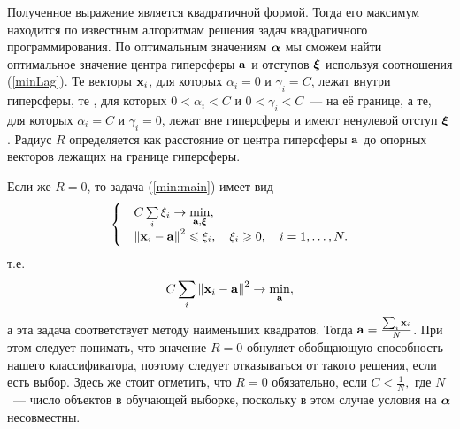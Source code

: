 Полученное выражение является квадратичной формой. 
Тогда его максимум находится по известным алгоритмам решения задач квадратичного программирования. 
По оптимальным значениям $\boldsymbol{\mathbf{\alpha}}$ мы сможем найти оптимальное значение центра гиперсферы $\boldsymbol{\mathbf{a}}$ и отступов $\boldsymbol{\mathbf{\xi}}$ используя соотношения (\ref{minLag}). 
Те векторы $\boldsymbol{\mathbf{x}}_i$, для которых $\alpha_i=0$ и $\gamma_i=C$, лежат внутри гиперсферы, те , для которых $0<\alpha_i<C$ и $0<\gamma_i<C$~--- на её границе, а те, для которых $\alpha_i=C$ и $\gamma_i=0$, лежат вне гиперсферы и имеют ненулевой отступ $\boldsymbol{\mathbf{\xi}}$. 
Радиус $R$ определяется как расстояние от центра гиперсферы $\boldsymbol{\mathbf{a}}$ до опорных векторов лежащих на границе гиперсферы.



% 

Если же $R = 0$, то задача (\ref{min:main}) имеет вид 
\begin{equation}
			\begin{cases}
			&C\sum\limits_i\xi_i \to \min\limits_{\boldsymbol{\mathbf{a}}, \boldsymbol{\mathbf{\xi}}}, \\
			&\left\|{\boldsymbol{\mathbf{x}}_i-\boldsymbol{\mathbf{a}}}\right\|^2\leqslant \xi_i,\quad\xi_i\geqslant0,\quad i = 1,\ldots,N.
			\end{cases} 
\end{equation}
т.е.
\begin{equation}
			C\sum\limits_i\left\|{\boldsymbol{\mathbf{x}}_i-\boldsymbol{\mathbf{a}}}\right\|^2 \to \min\limits_{\boldsymbol{\mathbf{a}}},
\end{equation} 
а эта задача соответствует методу наименьших квадратов. Тогда $\boldsymbol{\mathbf{a}} = \frac{\sum_i \boldsymbol{\mathbf{x}}_i}N$. При этом следует понимать, что значение $R=0$ обнуляет обобщающую способность нашего классификатора, поэтому следует отказываться от такого решения, если есть выбор. Здесь же стоит отметить, что $R = 0$ обязательно, если $C < \frac1N,$ где $N$~--- число объектов в обучающей выборке, поскольку в этом случае условия на $\boldsymbol{\mathbf{\alpha}}$ несовместны.